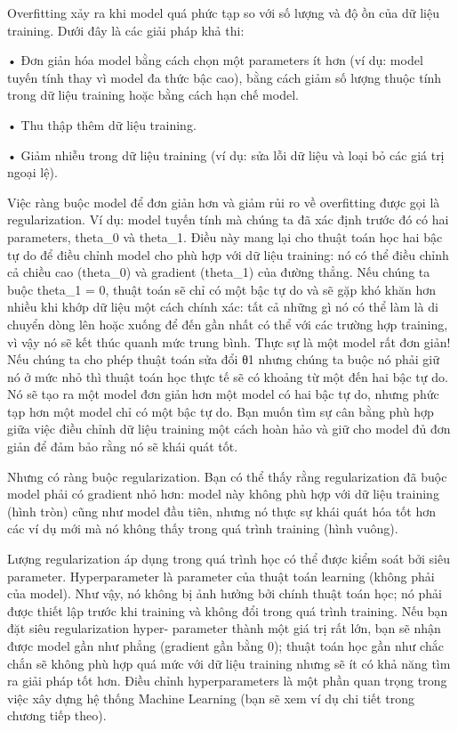 Overfitting xảy ra khi model quá phức tạp so với số lượng và độ ồn của dữ liệu training. Dưới đây là các giải pháp khả thi:

• Đơn giản hóa model bằng cách chọn một parameters ít hơn (ví dụ: model tuyến tính thay vì model đa thức bậc cao), bằng cách giảm số lượng thuộc tính trong dữ liệu training hoặc bằng cách hạn chế model.

• Thu thập thêm dữ liệu training.

• Giảm nhiễu trong dữ liệu training (ví dụ: sửa lỗi dữ liệu và loại bỏ các giá trị ngoại lệ).

Việc ràng buộc model để đơn giản hơn và giảm rủi ro về overfitting được gọi là regularization. Ví dụ: model tuyến tính mà chúng ta đã xác định trước đó có hai parameters, theta\_0 và theta\_1. Điều này mang lại cho thuật toán học hai bậc tự do để điều chỉnh model cho phù hợp với dữ liệu training: nó có thể điều chỉnh cả chiều cao (theta\_0) và gradient (theta\_1) của đường thẳng. Nếu chúng ta buộc theta\_1 = 0, thuật toán sẽ chỉ có một bậc tự do và sẽ gặp khó khăn hơn nhiều khi khớp dữ liệu một cách chính xác: tất cả những gì nó có thể làm là di chuyển dòng lên hoặc xuống để đến gần nhất có thể với các trường hợp training, vì vậy nó sẽ kết thúc quanh mức trung bình. Thực sự là một model rất đơn giản! Nếu chúng ta cho phép thuật toán sửa đổi θ1 nhưng chúng ta buộc nó phải giữ nó ở mức nhỏ thì thuật toán học thực tế sẽ có khoảng từ một đến hai bậc tự do. Nó sẽ tạo ra một model đơn giản hơn một model có hai bậc tự do, nhưng phức tạp hơn một model chỉ có một bậc tự do. Bạn muốn tìm sự cân bằng phù hợp giữa việc điều chỉnh dữ liệu training một cách hoàn hảo và giữ cho model đủ đơn giản để đảm bảo rằng nó sẽ khái quát tốt.

Nhưng có ràng buộc regularization. Bạn có thể thấy rằng regularization đã buộc model phải có gradient nhỏ hơn: model này không phù hợp với dữ liệu training (hình tròn) cũng như model đầu tiên, nhưng nó thực sự khái quát hóa tốt hơn các ví dụ mới mà nó không thấy trong quá trình training (hình vuông).

Lượng regularization áp dụng trong quá trình học có thể được kiểm soát bởi siêu parameter. Hyperparameter là parameter của thuật toán learning (không phải của model). Như vậy, nó không bị ảnh hưởng bởi chính thuật toán học; nó phải được thiết lập trước khi training và không đổi trong quá trình training. Nếu bạn đặt siêu regularization hyper- parameter thành một giá trị rất lớn, bạn sẽ nhận được model gần như phẳng (gradient gần bằng 0); thuật toán học gần như chắc chắn sẽ không phù hợp quá mức với dữ liệu training nhưng sẽ ít có khả năng tìm ra giải pháp tốt hơn. Điều chỉnh hyperparameters là một phần quan trọng trong việc xây dựng hệ thống Machine Learning (bạn sẽ xem ví dụ chi tiết trong chương tiếp theo).

